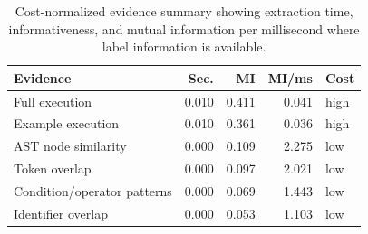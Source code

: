 \begin{table}[!htbp]
\centering
\scriptsize
\begin{tabular}{lrrrl}
\toprule
Evidence & Sec. & MI & MI/ms & Cost \\
\midrule
Full execution & 0.010 & 0.411 & 0.041 & high \\
Example execution & 0.010 & 0.361 & 0.036 & high \\
AST node similarity & 0.000 & 0.109 & 2.275 & low \\
Token overlap & 0.000 & 0.097 & 2.021 & low \\
Condition/operator patterns & 0.000 & 0.069 & 1.443 & low \\
Identifier overlap & 0.000 & 0.053 & 1.103 & low \\
\bottomrule
\end{tabular}
\vspace{0.5em}
\caption{Cost-normalized evidence summary showing extraction time, informativeness, and mutual information per millisecond where label information is available.}
\label{tab:evidence-costs}
\end{table}

